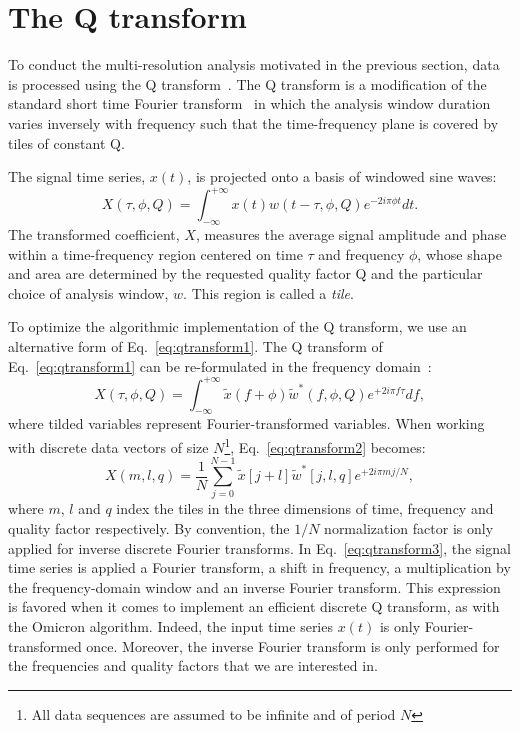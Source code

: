 \section{The Q transform} \label{sec:qtransform}
To conduct the multi-resolution analysis motivated in the previous section, data is processed using the Q transform~\cite{Brown:1991}. The Q transform is a modification of the standard short time Fourier transform~\cite{Gabor:1946} in which the analysis window duration varies inversely with frequency such that the time-frequency plane is covered by tiles of constant Q.

The signal time series, $x(t)$, is projected onto a basis of windowed sine waves:
\begin{equation}
  X(\tau, \phi, Q) = \int_{-\infty}^{+\infty}{ x(t) w(t-\tau,\phi,Q) e^{-2i\pi\phi t}dt}.
  \label{eq:qtransform1}
\end{equation}
The transformed coefficient, $X$, measures the average signal amplitude and phase within a time-frequency region centered on time $\tau$ and frequency $\phi$, whose shape and area are determined by the requested quality factor Q and the particular choice of analysis window, $w$. This region is called a \textit{tile}.

To optimize the algorithmic implementation of the Q transform, we use an alternative form of Eq.~\ref{eq:qtransform1}. The Q transform of Eq.~\ref{eq:qtransform1} can be re-formulated in the frequency domain~\cite{Chatterji:2004}:
\begin{equation}
  X(\tau, \phi, Q) = \int_{-\infty}^{+\infty}{ \tilde{x}(f+\phi) \tilde{w}^{*}(f,\phi,Q) e^{+2i\pi f \tau}df},
  \label{eq:qtransform2}
\end{equation}
where tilded variables represent Fourier-transformed variables. When working with discrete data vectors of size $N$\footnote{All data sequences are assumed to be infinite and of period $N$}, Eq.~\ref{eq:qtransform2} becomes:
\begin{equation}
  X(m,l,q) = \frac{1}{N}\sum_{j=0}^{N-1}{\tilde{x}[j+l]\tilde{w}^{*}[j,l,q]e^{+2i\pi mj/N}},
  \label{eq:qtransform3}
\end{equation}
where $m$, $l$ and $q$ index the tiles in the three dimensions of time, frequency and quality factor respectively. By convention, the $1/N$ normalization factor is only applied for inverse discrete Fourier transforms. In Eq.~\ref{eq:qtransform3}, the signal time series is applied a Fourier transform, a shift in frequency, a multiplication by the frequency-domain window and an inverse Fourier transform. This expression is favored when it comes to implement an efficient discrete Q transform, as with the Omicron algorithm. Indeed, the input time series $x(t)$ is only Fourier-transformed once. Moreover, the inverse Fourier transform is only performed for the frequencies and quality factors that we are interested in.

